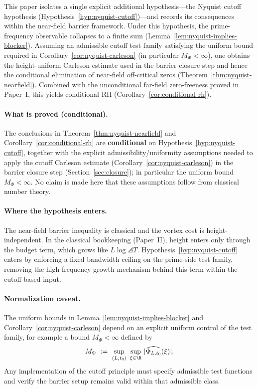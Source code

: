 \documentclass[11pt]{article}
\begin{document}
This paper isolates a single explicit additional hypothesis---the Nyquist cutoff hypothesis (Hypothesis~\ref{hyp:nyquist-cutoff})---and records its consequences within the near-field barrier framework.
Under this hypothesis, the prime-frequency observable collapses to a finite sum (Lemma~\ref{lem:nyquist-implies-blocker}).
Assuming an admissible cutoff test family satisfying the uniform bound required in Corollary~\ref{cor:nyquist-carleson} (in particular $M_\Phi<\infty$), one obtains the height-uniform Carleson estimate used in the barrier closure step and hence the conditional elimination of near-field off-critical zeros (Theorem~\ref{thm:nyquist-nearfield}).
Combined with the unconditional far-field zero-freeness proved in Paper~I, this yields conditional RH (Corollary~\ref{cor:conditional-rh}).

\paragraph{What is proved (conditional).}
The conclusions in Theorem~\ref{thm:nyquist-nearfield} and Corollary~\ref{cor:conditional-rh} are \textbf{conditional} on Hypothesis~\ref{hyp:nyquist-cutoff}, together with the explicit admissibility/uniformity assumptions needed to apply the cutoff Carleson estimate (Corollary~\ref{cor:nyquist-carleson}) in the barrier closure step (Section~\ref{sec:closure}); in particular the uniform bound $M_\Phi<\infty$.
No claim is made here that these assumptions follow from classical number theory.

\paragraph{Where the hypothesis enters.}
The near-field barrier inequality is classical and the vortex cost is height-independent.
In the classical bookkeeping (Paper~II), height enters only through the budget term, which grows like $L\log\angles{T}$.
Hypothesis~\ref{hyp:nyquist-cutoff} enters by enforcing a fixed bandwidth ceiling on the prime-side test family, removing the high-frequency growth mechanism behind this term within the cutoff-based input.

\paragraph{Normalization caveat.}
The uniform bounds in Lemma~\ref{lem:nyquist-implies-blocker} and Corollary~\ref{cor:nyquist-carleson} depend on an explicit uniform control of the test family, for example a bound $M_\Phi<\infty$ defined by
\[
  M_\Phi\ :=\ \sup_{(L,t_0)}\ \sup_{\xi\in\R}\,|\widehat{\Phi_{L,t_0}}(\xi)|.
\]
Any implementation of the cutoff principle must specify admissible test functions and verify the barrier setup remains valid within that admissible class.
\end{document}
